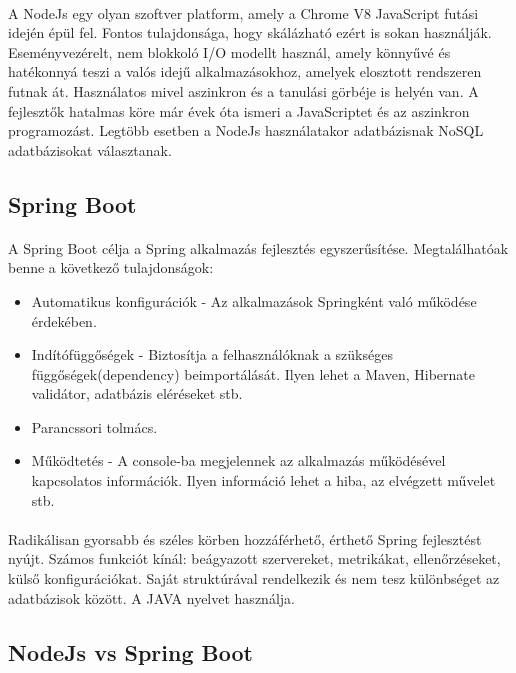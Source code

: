 	\paragraph{} 
	A NodeJs egy olyan szoftver platform, amely a Chrome V8 JavaScript futási idején épül fel. Fontos tulajdonsága, hogy skálázható ezért is sokan használják. Eseményvezérelt, nem blokkoló I/O modellt használ, amely könnyűvé és hatékonnyá teszi a valós idejű alkalmazásokhoz, amelyek elosztott rendszeren futnak át. Használatos mivel aszinkron és a tanulási görbéje is helyén van. A fejlesztők hatalmas köre már évek óta ismeri a JavaScriptet és az aszinkron programozást. Legtöbb esetben a NodeJs használatakor adatbázisnak NoSQL adatbázisokat választanak.\cite{js2016node}
	
	\subsection{Spring Boot}
	\paragraph{}
	A Spring Boot célja a Spring alkalmazás fejlesztés egyszerűsítése. Megtalálhatóak benne a következő tulajdonságok:
	\begin{itemize}
		\item Automatikus konfigurációk - Az alkalmazások Springként való működése érdekében.
		\item Indítófüggőségek - Biztosítja a felhasználóknak a szükséges függőségek(dependency) beimportálását. Ilyen lehet a Maven, Hibernate validátor, adatbázis eléréseket stb.
		\item Parancssori tolmács.
		\item Működtetés - A console-ba megjelennek az alkalmazás működésével kapcsolatos információk. Ilyen információ lehet a hiba, az elvégzett művelet stb.
	\end{itemize}
	
	\paragraph{}
	Radikálisan gyorsabb és széles körben hozzáférhető, érthető Spring fejlesztést nyújt. Számos funkciót kínál: beágyazott szervereket, metrikákat, ellenőrzéseket, külső konfigurációkat. Saját struktúrával rendelkezik és nem tesz különbséget az adatbázisok között. A JAVA nyelvet használja.\cite{jovanovic2017java}
	
	\subsection{NodeJs vs Spring Boot}

